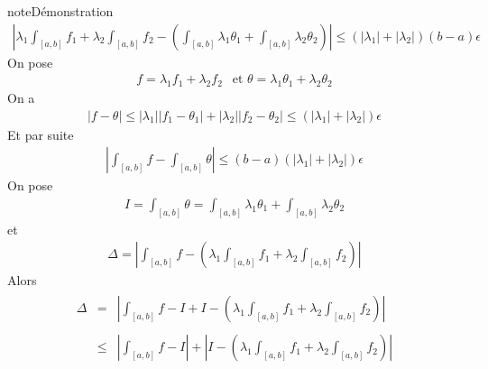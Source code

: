 \documentclass[letterpaper,10pt,french]{sphinxmanual}
\begin{document}
\begin{sphinxadmonition}{note}{Démonstration}
\begin{equation*}
\begin{split}
\left|\lambda_1\int_{[a, b]} f_1 +\lambda_2\int_{[a, b]} f_2 - \left(\int_{[a, b]} \lambda_1\theta_1 + \int_{[a, b]} \lambda_2\theta_2\right)\right| \leq (|\lambda_1|+|\lambda_2|)(b-a)\epsilon
\end{split}
\end{equation*}
\sphinxAtStartPar
On pose
\begin{equation*}
\begin{split}
f= \lambda_1 f_1 + \lambda_2 f_2 ~~ \mbox{ et } \theta = \lambda_1 \theta_1 + \lambda_2 \theta_2
\end{split}
\end{equation*}
\sphinxAtStartPar
On a
\begin{equation*}
\begin{split}
|f-\theta| \leq |\lambda_1||f_1-\theta_1| + |\lambda_2||f_2 - \theta_2| \leq (|\lambda_1|+|\lambda_2|)\epsilon
\end{split}
\end{equation*}
\sphinxAtStartPar
Et par suite
\begin{equation*}
\begin{split}
\left|\int_{[a, b]} f- \int_{[a, b]} \theta \right| \leq (b-a)(|\lambda_1|+|\lambda_2|)\epsilon
\end{split}
\end{equation*}
\sphinxAtStartPar
On pose
\begin{equation*}
\begin{split}
I = \int_{[a, b]} \theta = \int_{[a, b]} \lambda_1\theta_1 + \int_{[a, b]} \lambda_2\theta_2
\end{split}
\end{equation*}
\sphinxAtStartPar
et
\begin{equation*}
\begin{split}
\Delta = \left|\int_{[a, b]} f- \left(\lambda_1\int_{[a, b]} f_1 +\lambda_2\int_{[a, b]} f_2\right)\right|
\end{split}
\end{equation*}
\sphinxAtStartPar
Alors
\begin{equation*}
\begin{split}
\begin{aligned}
\Delta &=& \left|\int_{[a, b]} f- I + I - \left(\lambda_1\int_{[a, b]} f_1 +\lambda_2\int_{[a, b]} f_2\right)\right| \\ \\
& \leq & \left|\int_{[a, b]} f- I\right| + \left| I - \left(\lambda_1\int_{[a, b]} f_1 +\lambda_2\int_{[a, b]} f_2\right)\right| \\ \\

\end{aligned}
\end{split}
\end{equation*}
\end{sphinxadmonition}
\end{document}
